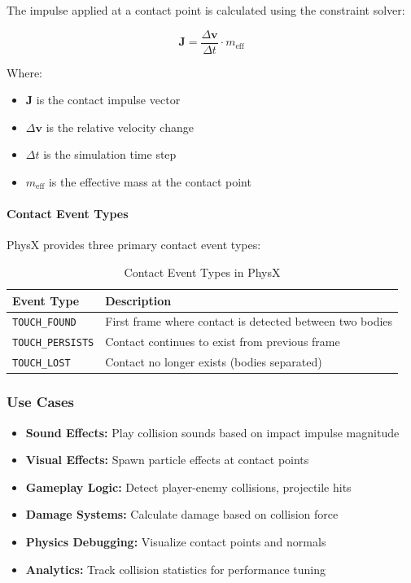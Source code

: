 The impulse applied at a contact point is calculated using the constraint solver:

\begin{equation}
\mathbf{J} = \frac{\Delta \mathbf{v}}{\Delta t} \cdot m_{\text{eff}}
\end{equation}

Where:
\begin{itemize}
    \item $\mathbf{J}$ is the contact impulse vector
    \item $\Delta \mathbf{v}$ is the relative velocity change
    \item $\Delta t$ is the simulation time step
    \item $m_{\text{eff}}$ is the effective mass at the contact point
\end{itemize}

\paragraph{Contact Event Types}

PhysX provides three primary contact event types:

\begin{table}[h]
\centering
\begin{tabular}{|l|p{8cm}|}
\hline
\textbf{Event Type} & \textbf{Description} \\
\hline
\texttt{TOUCH\_FOUND} & First frame where contact is detected between two bodies \\
\hline
\texttt{TOUCH\_PERSISTS} & Contact continues to exist from previous frame \\
\hline
\texttt{TOUCH\_LOST} & Contact no longer exists (bodies separated) \\
\hline
\end{tabular}
\caption{Contact Event Types in PhysX}
\end{table}

\subsubsection{Use Cases}

\begin{itemize}
    \item \textbf{Sound Effects:} Play collision sounds based on impact impulse magnitude
    \item \textbf{Visual Effects:} Spawn particle effects at contact points
    \item \textbf{Gameplay Logic:} Detect player-enemy collisions, projectile hits
    \item \textbf{Damage Systems:} Calculate damage based on collision force
    \item \textbf{Physics Debugging:} Visualize contact points and normals
    \item \textbf{Analytics:} Track collision statistics for performance tuning
\end{itemize}

